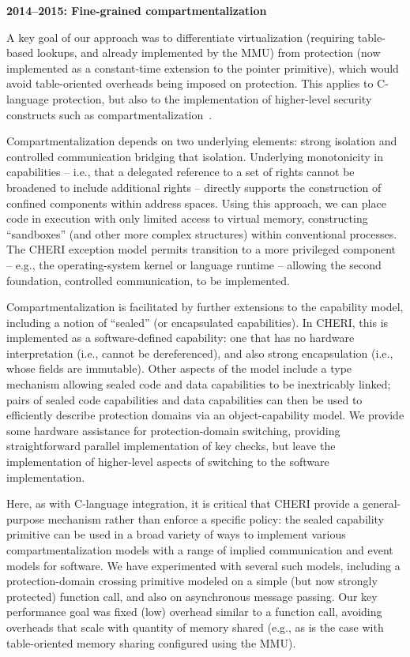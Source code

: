 \medskip
\noindent
\textbf{2014--2015: Fine-grained compartmentalization}

\smallskip
\noindent
A key goal of our approach was to differentiate virtualization (requiring
table-based lookups, and already implemented by the MMU) from protection
(now implemented as a constant-time extension to the pointer primitive), which
would avoid table-oriented overheads being imposed on protection.
This applies to C-language protection, but also to the implementation of
higher-level security constructs such as
compartmentalization~\cite{watson15:cheri,watson2016:microjournal}.

Compartmentalization depends on two underlying elements: strong isolation and
controlled communication bridging that isolation.
Underlying monotonicity in capabilities -- i.e., that a delegated reference
to a set of rights cannot be broadened to include additional rights --
directly supports the construction of confined components within address
spaces.
Using this approach, we can place code in execution with only limited
access to virtual memory, constructing ``sandboxes'' (and other more complex 
structures) within conventional processes.
The CHERI exception model permits transition to a more privileged component
-- e.g., the operating-system kernel or language runtime -- allowing the
second foundation, controlled communication, to be implemented.

Compartmentalization is facilitated by further extensions to the capability
model, including a notion of ``sealed'' (or encapsulated capabilities).
In CHERI, this is implemented as a software-defined capability: one that has
no hardware interpretation (i.e., cannot be dereferenced), and also strong
encapsulation (i.e., whose fields are immutable).
Other aspects of the model include a type mechanism allowing sealed code and
data capabilities to be inextricably linked; pairs of sealed code 
capabilities and data
capabilities can then be used to efficiently describe protection domains via
an object-capability model.
We provide some hardware assistance for protection-domain switching,
providing straightforward parallel implementation of key checks, but leave
the implementation of higher-level aspects of switching to the software
implementation.

Here, as with C-language integration, it is critical that CHERI provide a
general-purpose mechanism rather than enforce a specific policy: the sealed
capability primitive can be used in a broad variety of ways to implement
various compartmentalization models with a range of implied communication
and event models for software.
We have experimented with several such models, including a protection-domain
crossing primitive modeled on a simple (but now strongly protected) function
call, and also on asynchronous message passing.
Our key performance goal was fixed (low) overhead similar to a function call,
avoiding overheads that scale with quantity of memory shared (e.g., as is the
case with table-oriented memory sharing configured using the MMU).

